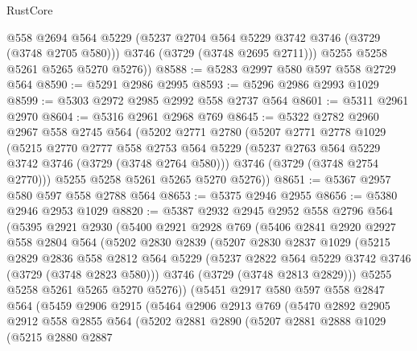 \begin{lexlean}{RustCore}
\begin{coremodule}
          @558
          @2694
          @564
          @5229
          (@5237 @2704 @564 @5229 @3742 @3746 (@3729 (@3748 @2705 @580)))
          @3746
          (@3729 (@3748 @2695 @2711)))
        @5255
        @5258
        @5261
        @5265
        @5270
        @5276))
@8588 := @5283 @2997 @580 @597 @558 @2729 @564
@8590 := @5291 @2986 @2995
@8593 := @5296 @2986 @2993 @1029
@8599 := @5303 @2972 @2985 @2992 @558 @2737 @564
@8601 := @5311 @2961 @2970
@8604 := @5316 @2961 @2968 @769
@8645 := @5322
    @2782
    @2960
    @2967
    @558
    @2745
    @564
    (@5202
      @2771
      @2780
      (@5207
        @2771
        @2778
        @1029
        (@5215
          @2770
          @2777
          @558
          @2753
          @564
          @5229
          (@5237 @2763 @564 @5229 @3742 @3746 (@3729 (@3748 @2764 @580)))
          @3746
          (@3729 (@3748 @2754 @2770)))
        @5255
        @5258
        @5261
        @5265
        @5270
        @5276))
@8651 := @5367 @2957 @580 @597 @558 @2788 @564
@8653 := @5375 @2946 @2955
@8656 := @5380 @2946 @2953 @1029
@8820 := @5387
    @2932
    @2945
    @2952
    @558
    @2796
    @564
    (@5395
      @2921
      @2930
      (@5400
        @2921
        @2928
        @769
        (@5406
          @2841
          @2920
          @2927
          @558
          @2804
          @564
          (@5202
            @2830
            @2839
            (@5207
              @2830
              @2837
              @1029
              (@5215
                @2829
                @2836
                @558
                @2812
                @564
                @5229
                (@5237 @2822 @564 @5229 @3742 @3746 (@3729 (@3748 @2823 @580)))
                @3746
                (@3729 (@3748 @2813 @2829)))
              @5255
              @5258
              @5261
              @5265
              @5270
              @5276))
          (@5451
            @2917
            @580
            @597
            @558
            @2847
            @564
            (@5459
              @2906
              @2915
              (@5464
                @2906
                @2913
                @769
                (@5470
                  @2892
                  @2905
                  @2912
                  @558
                  @2855
                  @564
                  (@5202
                    @2881
                    @2890
                    (@5207
                      @2881
                      @2888
                      @1029
                      (@5215
                        @2880
                        @2887

\end{coremodule}
\end{lexlean}
